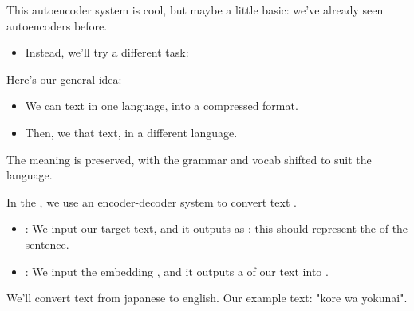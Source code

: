         This autoencoder system is cool, but maybe a little basic: we've already seen autoencoders before.

        \begin{itemize}
            \item Instead, we'll try a different task: 
        \end{itemize}

        Here's our general idea:

        \begin{itemize}
            \item We can  text in one language, into a compressed format.

            \item Then, we  that text, in a different language.
        \end{itemize}

        The meaning is preserved, with the grammar and vocab shifted to suit the language.\\

        \begin{definition}
            In the , we use an encoder-decoder system to convert text .

            \begin{itemize}
                \item {}: We input our target text, and it outputs as : this should represent the  of the sentence.

                \item {}: We input the embedding , and it outputs a  of our text into .
            \end{itemize}
            
        \end{definition}


        \miniex We'll convert text from japanese to english. Our example text: "kore wa yokunai".

